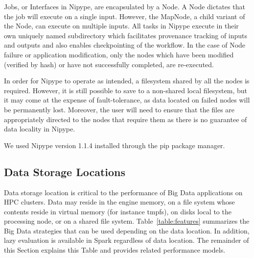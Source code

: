 Jobs, or Interfaces in Nipype, are encapsulated by a Node. A Node dictates that
the job will execute on a single input. However, the MapNode, 
a child variant of the Node, can execute on multiple inputs. All tasks in
Nipype execute in their own uniquely named subdirectory which facilitates provenance 
tracking of inputs and outputs and also enables checkpointing of the workflow.
In the case of Node failure or application modification, only the nodes which have
been modified (verified by hash) or have not successfully completed, are re-executed.

In order for Nipype to operate as intended, a filesystem shared by all the nodes 
is required. However, it is still possible to save to a non-shared 
local filesystem, but it may come at the expense of fault-tolerance, as data 
located on failed nodes will be permanently lost. Moreover, the 
user will need to ensure that the files are appropriately directed to 
the nodes that require them as there is no guarantee of data locality 
in Nipype.

We used Nipype version 1.1.4 installed through the pip package manager.

\subsection{Data Storage Locations}

Data storage location is critical to the performance of Big Data 
applications on HPC clusters.
Data may reside in the engine memory, on 
a file system whose contents reside in virtual memory (for instance 
tmpfs), on disks local to the processing node, or on a shared 
file system. Table~\ref{table:features} summarizes the Big Data 
strategies that can be used depending on the data location. In 
addition, lazy evaluation is available in Spark regardless of data 
location. The remainder of this Section explains this Table and 
provides related performance models.

